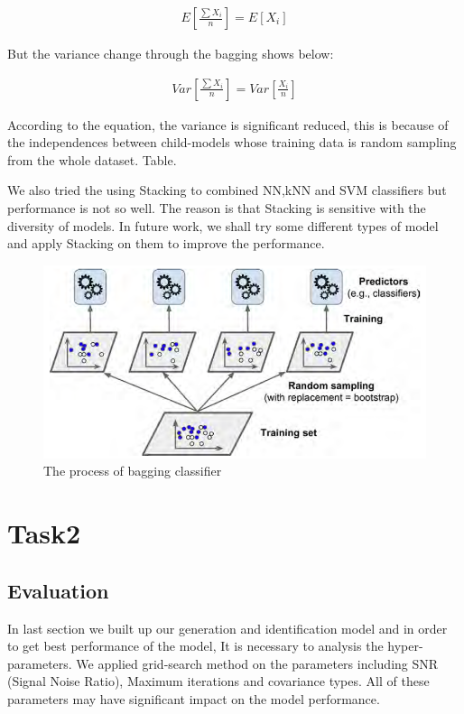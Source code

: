 \documentclass[12pt,DIV14,BCOR12mm,a4paper,footinclude=false,headinclude,parskip=half-,twoside,openright,cleardoublepage=empty,toc=index,bibliography=totoc,listof=totoc]{scrreprt}
\numberwithin{equation}{chapter}
\begin{document}
  \begin{align}
 E[\frac{\sum X_{i}}{n}]=E[X_{i}]
  \end{align}
 
 But the variance change through the bagging shows below:
 
   \begin{align}
 Var[\frac{\sum X_{i}}{n}]=Var[\frac{X_{i}}{n}]
 \end{align}
 
 According to the equation, the variance is significant reduced, this is because of the independences between child-models whose training data is random sampling from the whole dataset. Table.
 
 We also tried the using Stacking to combined NN,kNN and SVM classifiers but performance is not so well. The reason is that Stacking is sensitive with the diversity of models. In future work, we shall try some different types of model and apply Stacking on them to improve the performance.
 \begin{figure}
 	\centering
 	\includegraphics[scale=0.7]{image/bagging}
 	\caption{The process of bagging classifier}
 	\label{bagging}
 \end{figure}
 

\chapter{Task2}
\section{Evaluation}
In last section we built up our generation and identification model and in order to get best performance of the model, It is necessary to analysis the hyper-parameters. We applied grid-search method on the parameters including SNR (Signal Noise Ratio), Maximum iterations and covariance types. All of these parameters may have significant impact on the model performance.
\end{document}
